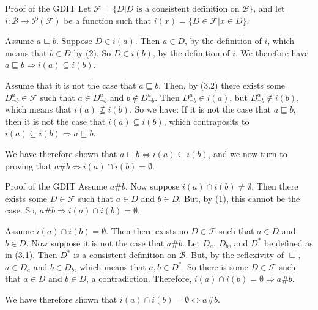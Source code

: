 \documentclass{beamer}
\begin{document}
\begin{frame}{Proof of the GDIT}
Let $\mathcal{F}=\{D\vert D\text{ is a consistent definition on }\mathcal{B}\}$, and let $i:\mathcal{B}\rightarrow\mathcal{P}(\mathcal{F})$ be a function such that $i(x)=\{D\in\mathcal{F}\vert x\in D\}$.
\par\vspace{.125in}
Assume $a\sqsubseteq b$. Suppose $D\in i(a)$. Then $a\in D$, by the definition of $i$, which means that $b\in D$ by (2). So $D\in i(b)$, by the definition of $i$. We therefore have $a\sqsubseteq b\Rightarrow i(a)\subseteq i(b)$.
\par\vspace{.125in}
Assume that it is not the case that $a\sqsubseteq b$. Then, by (3.2) there exists some $D^a_{\lnot b}\in\mathcal{F}$ such that $a\in D^a_{\lnot b}$ and $b\notin D^a_{\lnot b}$. Then $D^a_{\lnot b}\in i(a)$, but $D^a_{\lnot b}\notin i(b)$, which means that $i(a)\not\subseteq i(b)$. So we have: If it is not the case that $a\sqsubseteq b$, then it is not the case that $i(a)\subseteq i(b)$, which contraposits to $i(a)\subseteq i(b)\Rightarrow a\sqsubseteq b$.
\par\vspace{.125in}
We have therefore shown that $a\sqsubseteq b\Leftrightarrow i(a)\subseteq i(b)$, and we now turn to proving that $a\#b\Leftrightarrow i(a)\cap i(b)=\emptyset$.
\end{frame}

\begin{frame}{Proof of the GDIT}
Assume $a\#b$. Now suppose $i(a)\cap i(b)\neq\emptyset$. Then there exists some $D\in\mathcal{F}$ such that $a\in D$ and $b\in D$. But, by (1), this cannot be the case. So,  $a\#b\Rightarrow i(a)\cap i(b)=\emptyset$.
\par\vspace{.125in}
Assume $i(a)\cap i(b)=\emptyset$. Then there exists no $D\in\mathcal{F}$ such that $a\in D$ and $b\in D$. Now suppose it is not the case that $a\#b$. Let $D_a$, $D_b$, and $D^*$ be defined as in (3.1). Then  $D^*$ is a consistent definition on $\mathcal{B}$. But, by the reflexivity of $\sqsubseteq $, $a\in D_a$ and $b\in D_b$, which means that $a,b\in D^*$. So there is some $D\in\mathcal{F}$ such that $a\in D$ and $b\in D$, a contradiction. Therefore, $i(a)\cap i(b)=\emptyset\Rightarrow a\#b$.
\par\vspace{.125in}
We have therefore shown that $i(a)\cap i(b)=\emptyset\Leftrightarrow a\#b$.
\end{frame}
\end{document}
